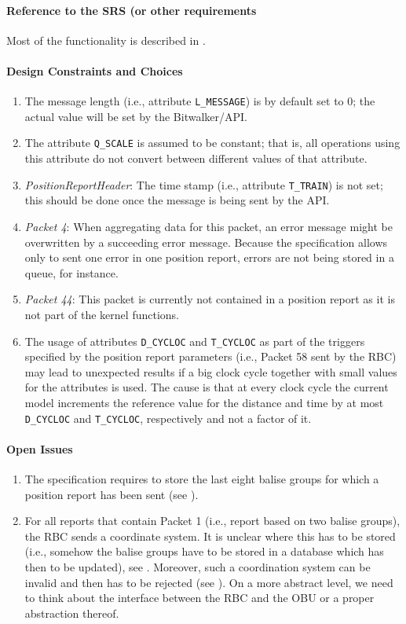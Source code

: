 \paragraph{Reference to the SRS (or other requirements}
Most of the functionality is described in \cite[Chapter~3.6.5]{subset-026}.

\paragraph{Design Constraints and Choices}
\begin{enumerate}
	\item The message length (i.e., attribute \verb+L_MESSAGE+) is by default set to 0; the actual value will be set by the Bitwalker/API.
	\item The attribute \verb+Q_SCALE+ is assumed to be constant; that is, all operations using this attribute do not convert between different values of that attribute.
	\item \textit{PositionReportHeader}: The time stamp (i.e., attribute \verb+T_TRAIN+) is not set; this should be done once the message is being sent by the API.
	\item \textit{Packet 4}: When aggregating data for this packet, an error message might be overwritten by a succeeding error message. Because the specification allows only to sent one error in one position report, errors are not being stored in a queue, for instance.
	\item \textit{Packet 44}: This packet is currently not contained in a position report as it is not part of the kernel functions.
	\item The usage of attributes \verb+D_CYCLOC+ and \verb+T_CYCLOC+ as part of the triggers specified by the position report parameters (i.e., Packet 58 sent by the RBC) may lead to unexpected results if a big clock cycle together with small values for the attributes is used. The cause is that at every clock cycle the current model increments the reference value for the distance and time by at most \verb+D_CYCLOC+ and \verb+T_CYCLOC+, respectively and not a factor of it.
\end{enumerate}

\paragraph{Open Issues}
\begin{enumerate}
	\item The specification requires to store the last eight balise groups for which a position report has been sent (see \cite[Chapter~3.6.2.2.2.c]{subset-026}).
	\item For all reports that contain Packet 1 (i.e., report based on two balise groups), the RBC sends a coordinate system. It is unclear where this has to be stored (i.e., somehow the balise groups have to be stored in a database which has then to be updated), see \cite[Chapter~3.4.2.3.3.6]{subset-026}. Moreover, such a coordination system can be invalid and then has to be rejected (see \cite[Chapter~3.4.2.3.3.7-8]{subset-026}). On a more abstract level, we need to think about the interface between the RBC and the OBU or a proper abstraction thereof.
\end{enumerate}
